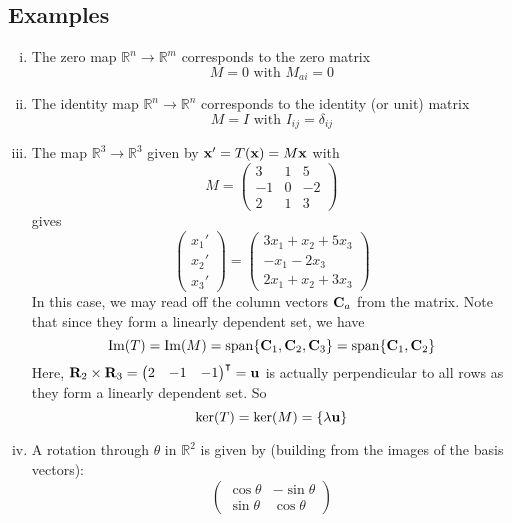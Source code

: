 \subsection{Examples}
\begin{enumerate}[(i)]
	\item The zero map \(\mathbb R^n \to \mathbb R^m\) corresponds to the zero matrix
	      \[
		      M = 0 \text{ with } M_{ai} = 0
	      \]
	\item The identity map \(\mathbb R^n \to \mathbb R^n\) corresponds to the identity (or unit) matrix
	      \[
		      M = I \text{ with } I_{ij} = \delta_{ij}
	      \]
	\item The map \(\mathbb R^3 \to \mathbb R^3\) given by \(\vb x' = T(\vb x) = M\vb x\) with
	      \[
		      M = \begin{pmatrix}
			      3  & 1 & 5  \\
			      -1 & 0 & -2 \\
			      2  & 1 & 3
		      \end{pmatrix}
	      \]
	      gives
	      \[
		      \begin{pmatrix}
			      x_1' \\ x_2' \\ x_3'
		      \end{pmatrix}
		      =
		      \begin{pmatrix}
			      3x_1 + x_2 + 5x_3 \\
			      -x_1 - 2x_3       \\
			      2x_1 + x_2 + 3x_3
		      \end{pmatrix}
	      \]
	      In this case, we may read off the column vectors \(\vb C_a\) from the matrix.
	      Note that since they form a linearly dependent set, we have
	      \[
		      \Im(T) = \Im(M) = \operatorname{span} \{ \vb C_1, \vb C_2, \vb C_3 \} = \operatorname{span} \{ \vb C_1, \vb C_2 \}
	      \]
	      Here, \(\vb R_2 \times \vb R_3 = \begin{pmatrix}
		      2 & -1 & -1
	      \end{pmatrix}^\intercal = \vb u\) is actually perpendicular to all rows as they form a linearly dependent set.
	      So
	      \[
		      \ker(T) = \ker(M) = \{ \lambda \vb u \}
	      \]
	\item A rotation through \(\theta\) in \(\mathbb R^2\) is given by (building from the images of the basis vectors):
	      \[
		      \begin{pmatrix}
			      \cos \theta & -\sin \theta \\
			      \sin \theta & \cos \theta

\end{pmatrix}\]
\end{enumerate}
